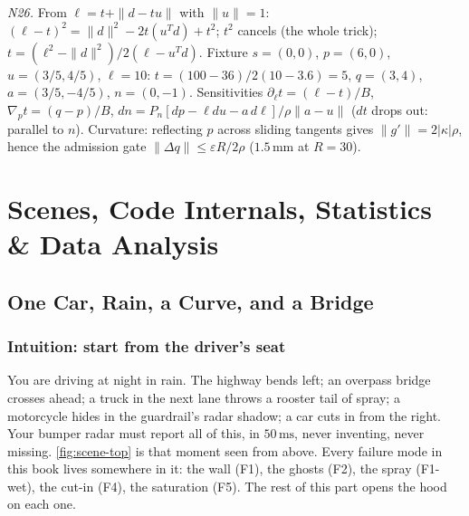 \documentclass[11pt,oneside]{book}
\begin{document}
\emph{N26.} From $\ell=t+\|d-tu\|$ with $\|u\|=1$:
$(\ell-t)^2=\|d\|^2-2t(u^Td)+t^2$; $t^2$ cancels (the whole trick);
$t=(\ell^2-\|d\|^2)/2(\ell-u^Td)$. Fixture $s=(0,0)$, $p=(6,0)$,
$u=(3/5,4/5)$, $\ell=10$: $t=(100-36)/2(10-3.6)=5$, $q=(3,4)$,
$a=(3/5,-4/5)$, $n=(0,-1)$. Sensitivities
$\partial_\ell t=(\ell-t)/B$, $\nabla_pt=(q-p)/B$,
$dn=P_n[dp-\ell du-a\,d\ell]/\rho\|a-u\|$ ($dt$ drops out: parallel to $n$).
Curvature: reflecting $p$ across sliding tangents gives
$\|g'\|=2|\kappa|\rho$, hence the admission gate
$\|\Delta q\|\le\varepsilon R/2\rho$ ($1.5\,\mathrm{mm}$ at $R=30$).

\part{Scenes, Code Internals, Statistics \& Data Analysis}

\chapter{One Car, Rain, a Curve, and a Bridge}
\label{ch:scene}

\section{Intuition: start from the driver's seat}
\label{sec:driver}

You are driving at night in rain. The highway bends left; an overpass
bridge crosses ahead; a truck in the next lane throws a rooster tail of
spray; a motorcycle hides in the guardrail's radar shadow; a car cuts in
from the right. Your bumper radar must report all of this, in $50\,\mathrm{ms}$,
never inventing, never missing. \cref{fig:scene-top} is that moment seen
from above. Every failure mode in this book lives somewhere in it: the wall
(F1), the ghosts (F2), the spray (F1-wet), the cut-in (F4), the saturation
(F5). The rest of this part opens the hood on each one.
\end{document}

